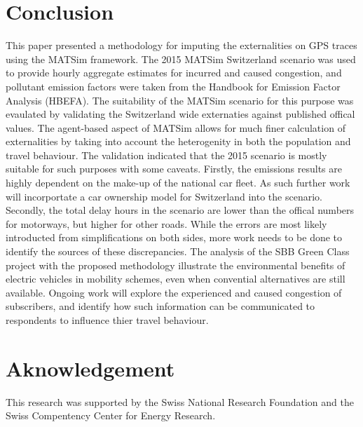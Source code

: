 \section{Conclusion}
This paper presented a methodology for imputing the externalities on GPS traces using the MATSim framework. 
The 2015 MATSim Switzerland scenario was used to provide hourly aggregate estimates for incurred and caused congestion, and pollutant emission factors were taken from the Handbook for Emission Factor Analysis (HBEFA). 
The suitability of the MATSim scenario for this purpose was evaulated by validating the Switzerland wide externaties against published offical values. 
The agent-based aspect of MATSim allows for much finer calculation of externalities by taking into account the heterogenity in both the population and travel behaviour. 
The validation indicated that the 2015 scenario is mostly suitable for such purposes with some caveats. 
Firstly, the emissions results are highly dependent on the make-up of the national car fleet. 
As such further work will incorportate a car ownership model for Switzerland into the scenario.
Secondly, the total delay hours in the scenario are lower than the offical numbers for motorways, but higher for other roads. 
While the errors are most likely introducted from simplifications on both sides, more work needs to be done to identify the sources of these discrepancies.
The analysis of the SBB Green Class project with the proposed methodology illustrate the environmental benefits of electric vehicles in mobility schemes, even when convential alternatives are still available. Ongoing work will explore the experienced and caused congestion of subscribers, and identify how such information can be communicated to respondents to influence thier travel behaviour. 

\section{Aknowledgement}
This research was supported by the Swiss National Research Foundation and the Swiss Compentency Center for Energy Research.
